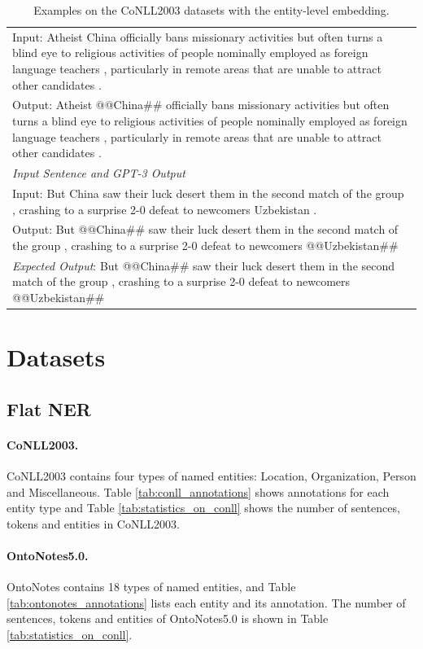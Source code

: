 \documentclass[11pt]{article}
\begin{document}
\begin{table}[th!]
{\begin{tabular}{l}
Input: Atheist China officially bans missionary activities but often turns a blind eye to religious activities of people nominally employed as foreign language teachers , particularly in remote areas that are unable to attract other candidates . \\
Output: Atheist @@China\#\# officially bans missionary activities but often turns a blind eye to religious activities of people nominally employed as foreign language teachers , particularly in remote areas that are unable to attract other candidates . \\\midrule
\textit{Input Sentence and GPT-3 Output} \\
Input: But China saw their luck desert them in the second match of the group , crashing to a surprise 2-0 defeat to newcomers Uzbekistan . \\
Output: But @@China\#\# saw their luck desert them in the second match of the group , crashing to a surprise 2-0 defeat to newcomers @@Uzbekistan\#\# \\
{\color{blue}\it Expected Output}: But @@China\#\# saw their luck desert them in the second match of the group , crashing to a surprise 2-0 defeat to newcomers @@Uzbekistan\#\#  \\\bottomrule
    \end{tabular}
    }
     \caption{Examples on the CoNLL2003 datasets with the entity-level embedding.}
    \label{tab:example_entity_level_embedding}
\end{table}

\section{Datasets}
\subsection{Flat NER}
\label{flat_ner_datasets_details}

\paragraph{CoNLL2003.} CoNLL2003 \cite{sang2003introduction} contains four types of named entities: Location, Organization, Person and Miscellaneous. Table \ref{tab:conll_annotations} shows annotations for each entity type and Table \ref{tab:statistics_on_conll} shows the number of sentences, tokens and entities in CoNLL2003.

\paragraph{OntoNotes5.0.} OntoNotes \cite{pradhan2013towards} contains 18 types of named entities, and Table \ref{tab:ontonotes_annotations} lists each entity and its annotation. The number of sentences, tokens and entities of OntoNotes5.0 is shown in Table \ref{tab:statistics_on_conll}.
\end{document}

